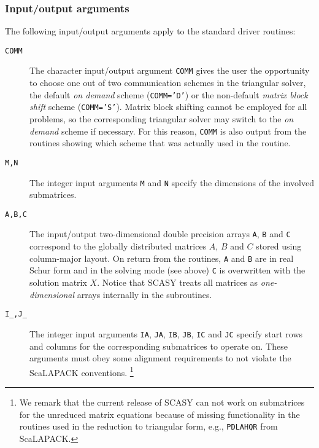 \documentclass[11pt]{article}
\begin{document}
\subsubsection{Input/output arguments}
The following input/output arguments apply to the standard driver
routines:
\begin{description}
\item[\texttt{COMM}] The character input/output argument
\texttt{COMM} gives the user the opportunity to choose one out of
two communication schemes in the triangular solver, the default
{\em on demand} scheme (\texttt{COMM='D'}) or the non-default {\em
matrix block shift} scheme (\texttt{COMM='S'}). Matrix block
shifting cannot be employed for all problems, so the corresponding
triangular solver may switch to the {\em on demand} scheme if
necessary. For this reason, \texttt{COMM} is also output from the
routines showing which scheme that was actually used in the
routine.

\item[\texttt{M,N}] The integer input arguments \texttt{M} and
\texttt{N} specify the dimensions of the involved submatrices.

\item[\texttt{A,B,C}] The input/output two-dimensional double
precision arrays \texttt{A}, \texttt{B} and \texttt{C} correspond
to the globally distributed matrices $A$, $B$ and $C$ stored using
column-major layout. On return from the routines, \texttt{A} and
\texttt{B} are in real Schur form and in the solving mode (see
above) \texttt{C} is overwritten with the solution matrix $X$.
Notice that SCASY treats all matrices as {\em one-dimensional}
arrays internally in the subroutines.

\item[\texttt{I\_,J\_}] The integer input arguments \texttt{IA},
\texttt{JA}, \texttt{IB}, \texttt{JB}, \texttt{IC} and \texttt{JC}
specify start rows and columns for the corresponding submatrices
to operate on. These arguments must obey some alignment
requirements to not violate the ScaLAPACK conventions.
\footnote{We remark that the current release of SCASY can not work
on submatrices for the unreduced matrix equations because of
missing functionality in the routines used in the reduction to
triangular form, e.g., \texttt{PDLAHQR} from ScaLAPACK.}


\end{description}
\end{document}
